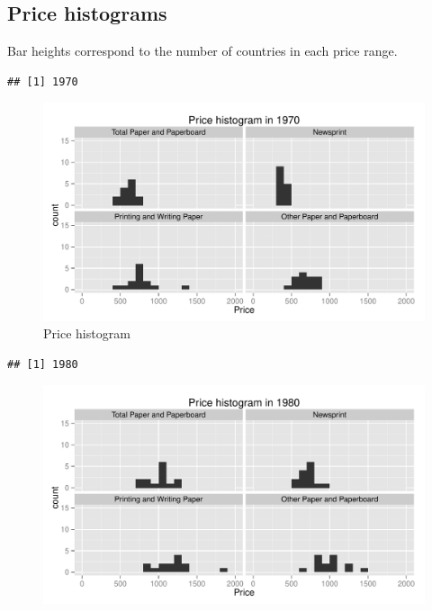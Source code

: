 \documentclass{scrartcl}\usepackage{graphicx, color}
\makeatletter
\newenvironment{kframe}{%
 \def\at@end@of@kframe{}%
 \ifinner\ifhmode%
  \def\at@end@of@kframe{\end{minipage}}%
  \begin{minipage}{\columnwidth}%
 \fi\fi%
 \def\FrameCommand##1{\hskip\@totalleftmargin \hskip-\fboxsep
 \colorbox{shadecolor}{##1}\hskip-\fboxsep
     \hskip-\linewidth \hskip-\@totalleftmargin \hskip\columnwidth}%
 \MakeFramed {\advance\hsize-\width
   \@totalleftmargin\z@ \linewidth\hsize
   \@setminipage}}%
 {\par\unskip\endMakeFramed%
 \at@end@of@kframe}
\newenvironment{knitrout}{}{} %
\makeatother
\begin{document}
\subsection{Price histograms}
Bar heights correspond to the number of countries in each price range.
\begin{knitrout}
\color{fgcolor}\begin{kframe}
\begin{verbatim}
## [1] 1970
\end{verbatim}
\end{kframe}\begin{figure}[h]


{\centering \includegraphics[width=1\linewidth]{figure/PriceHistogram1} 

}

\caption[Price histogram]{Price histogram\label{fig:PriceHistogram1}}
\end{figure}

\begin{kframe}\begin{verbatim}
## [1] 1980
\end{verbatim}
\end{kframe}\begin{figure}[h]


{\centering \includegraphics[width=1\linewidth]{figure/PriceHistogram2} 

}
\end{figure}
\end{knitrout}
\end{document}
